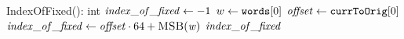 \PROCEDURE IndexOfFixed(): int
\STATE $\mathit{index\_of\_fixed} \gets -1$
  \STATE $w \leftarrow \texttt{words}[0]$
    \STATE $\mathit{offset} \gets \texttt{currToOrig}[0]$  
    \STATE $\mathit{index\_of\_fixed} \gets \mathit{offset} \cdot 64 + \textsc{MSB}(\mathit{w})$
  \ENDIF
\ENDIF
\RETURN $\mathit{index\_of\_fixed}$
